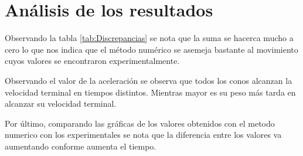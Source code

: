 \section{Análisis de los resultados}

Observando la tabla \ref{tab:Discrepancias} se nota que la
suma se hacerca mucho a cero lo que nos indica que el método
numérico se asemeja bastante al movimiento cuyos valores
se encontraron experimentalmente.

Observando el valor de la aceleración se observa que 
todos los conos alcanzan la velocidad terminal en tiempos
distintos. Mientras mayor es su peso más tarda en alcanzar 
su velocidad terminal.

Por último, comparando las gráficas de los valores obtenidos 
con el metodo numerico con los experimentales se nota
que la diferencia entre los valores va aumentando conforme
aumenta el tiempo.
